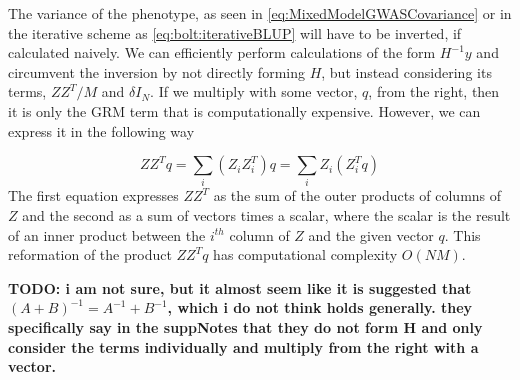 The variance of the phenotype, as seen in \cref{eq:MixedModelGWASCovariance} or in the iterative scheme as \cref{eq:bolt:iterativeBLUP} will have to be inverted, if calculated naively. We can efficiently perform calculations of the form $ H^{-1}y $ and circumvent the inversion by not directly forming $ H $, but instead considering its terms, $ ZZ^T / M$ and $ \delta I_N$. If we multiply with some vector, $ q $, from the right, then it is only the GRM term that is computationally expensive. However, we can express it in the following way

\begin{equation}
ZZ^T q = \sum_i \left( Z_i Z_i^T\right) q = \sum_i  Z_i \left(Z_i^T q\right) 
\end{equation}
The first equation expresses $ Z Z^T $ as the sum of the outer products of columns of $ Z $ and the second as a sum of vectors times a scalar, where the scalar is the result of an inner product between the $ i^{th} $ column of $ Z $ and the given vector $ q $. This reformation of the product $ Z Z^T q$ has computational complexity $ O(NM) $.

\textbf{TODO: i am not sure, but it almost seem like it is suggested that $ (A + B)^{-1} = A^{-1} + B^{-1} $, which i do not think holds generally. they specifically say in the suppNotes that they do not form H and only consider the terms individually and multiply from the right with a vector.}


%

